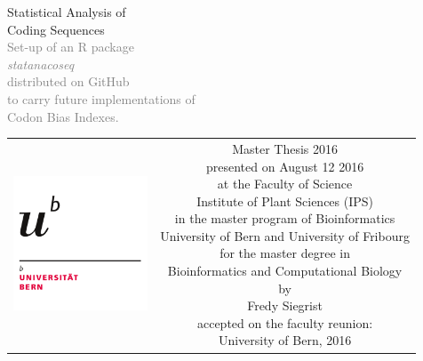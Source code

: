 \begin{titlepage}
\begin{center}
\sffamily

\null\vspace{2cm}
{\huge Statistical Analysis of \\[12pt] Coding Sequences } \\[24pt] 
\textcolor{gray}{\small{Set-up of an R package \\ \textit{statanacoseq} \\ distributed on GitHub \\ to carry future implementations of \\ Codon Bias Indexes.}}
    
\vfill

\begin{tabular} {cc}
\parbox{0.3\textwidth}{\includegraphics[width=4cm]{images/Logo_University_Bern}}
&
\parbox{0.7\textwidth}{%
	Master Thesis 2016\\
	presented on August 12 2016\\
	at the Faculty of Science\\
	Institute of Plant Sciences (IPS)\\
	in the master program of Bioinformatics\\
%
	University of Bern and University of Fribourg\\[6pt]
	for the master degree in \\
	Bioinformatics and Computational Biology\\
	by\\ [4pt]
	\null \hspace{3em} Fredy Siegrist\\[9pt]
%
\small
accepted on the faculty reunion:\\[4pt]
%

%
University of Bern,  2016}
\end{tabular}
\end{center}
\vspace{2cm}
\end{titlepage}



